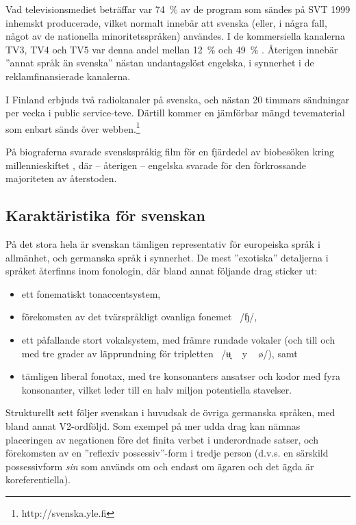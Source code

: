 \begin{multicols}{2}
Vad televisionsmediet beträffar var 74~\% av de program som sändes på
SVT 1999 inhemskt producerade, vilket normalt innebär att svenska
(eller, i några fall, något av de nationella minoritetsspråken)
användes. I de kommersiella kanalerna TV3, TV4 och TV5 var denna andel
mellan 12~\% och 49~\% \cite[79]{falk2001}. Återigen innebär ''annat språk
än svenska'' nästan undantagslöst engelska, i synnerhet i de
reklamfinansierade kanalerna.

I Finland erbjuds två radiokanaler på svenska, och nästan 20 timmars
sändningar per vecka i public service-teve. Därtill kommer en
jämförbar mängd tevematerial som enbart sänds över
webben.\footnote{http://svenska.yle.fi }

På biograferna svarade svenskspråkig film för en fjärdedel av
biobesöken kring millennieskiftet \cite[85]{falk2001}, där -- återigen
-- engelska svarade för den förkrossande majoriteten av återstoden.


\subsection{Karaktäristika för svenskan}

På det stora hela är svenskan tämligen representativ för europeiska
språk i allmänhet, och germanska språk i synnerhet. De mest ''exotiska''
detaljerna i språket återfinns inom fonologin, där bland annat
följande drag sticker ut:

\begin{itemize}[itemsep=0pt,parsep=0pt]
\item ett fonematiskt tonaccentsystem,
\item förekomsten av det tvärspråkligt ovanliga
  fonemet~{ /ɧ/},
\item ett påfallande stort vokalsystem, med främre rundade vokaler
  (och till och med tre grader av läpprundning för
  tripletten~{ /ʉ̘ ~ y
    ~ ø/}), samt
\item tämligen liberal fonotax, med tre konsonanters ansatser och
  kodor med fyra konsonanter, vilket leder till en halv miljon
  potentiella stavelser.
\end{itemize}

Strukturellt sett följer svenskan i huvudsak de övriga germanska
språken, med bland annat V2-ordföljd. Som exempel på mer udda drag kan
nämnas placeringen av negationen före det finita verbet i underordnade
satser, och förekomsten av en ''reflexiv possessiv''-form i tredje
person (d.v.s. en särskild possessivform \textit{sin} som används om
och endast om ägaren och det ägda är koreferentiella).


\end{multicols}
